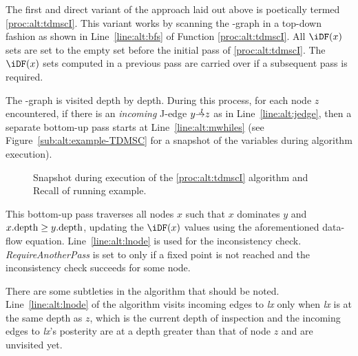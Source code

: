 {The first and direct variant of the approach laid out above is poetically termed \ref{proc:alt:tdmscI}. 
This variant works by scanning the \DJ-graph in a top-down fashion as shown in Line~\ref{line:alt:bfs} of Function \ref{proc:alt:tdmscI}. 
All $\iDF(x)$ sets are set to the empty set before the initial pass of \ref{proc:alt:tdmscI}. 
The $\iDF(x)$ sets computed in a previous pass are carried over if a subsequent pass is required.

The \DJ-graph is visited depth by depth. 
During this process, for each node $z$ encountered, if there is an \emph{incoming} J-edge $y \st{J} z$ as in Line~\ref{line:alt:jedge}, then a separate bottom-up pass starts at Line~\ref{line:alt:mwhiles} (see Figure~\ref{sub:alt:example-TDMSC} for a snapshot of the variables during algorithm execution).

\begin{figure}[b!]
  \hfill

  \caption{\protect{} Snapshot during execution of the \ref{proc:alt:tdmscI} algorithm and \protect{} Recall of running example.}
  \label{fig:alt:example-TDMSC}
\end{figure}



This bottom-up pass traverses all nodes $x$ such that $x$ dominates $y$ and $x.\textrm{depth} \geq y.\textrm{depth}$, updating the $\iDF(x)$ values using the aforementioned data-flow equation. 
Line~\ref{line:alt:lnode} is used for the inconsistency check. 
\textit{RequireAnotherPass} is set to \true only if a fixed point is not reached and the inconsistency check succeeds for some node.

There are some subtleties in the algorithm that should be noted. 
Line~\ref{line:alt:lnode} of the algorithm visits incoming edges to \textit{lx} only when \textit{lx} is at the same depth as $z$, which is the current depth of inspection and the incoming edges to \textit{lx}'s posterity are at a depth greater than that of node $z$ and are unvisited yet.

}
